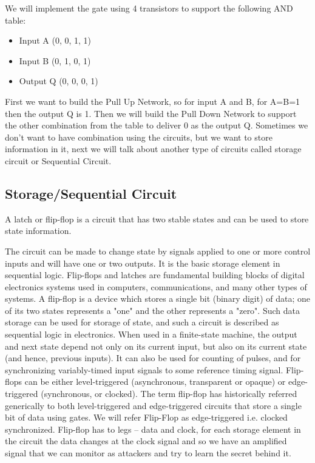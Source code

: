 We will implement the gate using 4 transistors to support the following AND table:
\begin{itemize}
\item Input A (0, 0, 1, 1)
\item Input B (0, 1, 0, 1)
    	\item Output Q (0, 0, 0, 1)
\end{itemize}

First we want to build the Pull Up Network, so for input A and B, for A=B=1 then the output Q is 1.
Then we will build the Pull Down Network to support the other combination from the table to deliver 0 as the output Q.
Sometimes we don’t want to have combination using the circuits, but we want to store information in it, next we will talk about another type of circuits called storage circuit or Sequential Circuit.
\subsection{ Storage/Sequential Circuit }
A latch or flip-flop is a circuit that has two stable states and can be used to store state information. 

The circuit can be made to change state by signals applied to one or more control inputs and will have one or two outputs. It is the basic storage element in sequential logic. Flip-flops and latches are fundamental building blocks of digital electronics systems used in computers, communications, and many other types of systems.
A flip-flop is a device which stores a single bit (binary digit) of data; one of its two states represents a "one" and the other represents a "zero". Such data storage can be used for storage of state, and such a circuit is described as sequential logic in electronics. When used in a finite-state machine, the output and next state depend not only on its current input, but also on its current state (and hence, previous inputs). It can also be used for counting of pulses, and for synchronizing variably-timed input signals to some reference timing signal.
Flip-flops can be either level-triggered (asynchronous, transparent or opaque) or edge-triggered (synchronous, or clocked). The term flip-flop has historically referred generically to both level-triggered and edge-triggered circuits that store a single bit of data using gates. We will refer Flip-Flop as edge-triggered i.e. clocked synchronized.
Flip-flop has to legs – data and clock, for each storage element in the circuit the data changes at the clock signal and so we have an amplified signal that we can monitor as attackers and try to learn the secret behind it.
